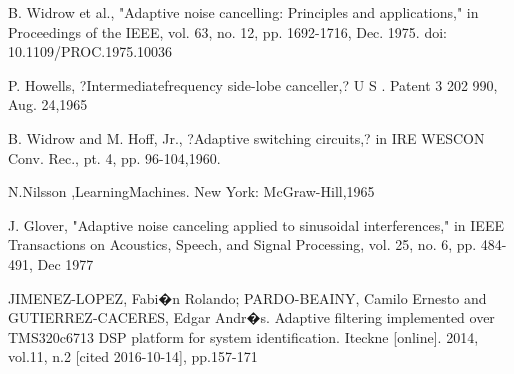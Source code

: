 \documentclass[conference]{IEEEtran}
\begin{document}
%
%
%
\begin{thebibliography}{1}

B. Widrow et al., "Adaptive noise cancelling: Principles and applications," in Proceedings of the IEEE, vol. 63, no. 12, pp. 1692-1716, Dec. 1975.
doi: 10.1109/PROC.1975.10036

P. Howells, ?Intermediatefrequency side-lobe canceller,? U S .
Patent 3 202 990, Aug. 24,1965

B. Widrow and M. Hoff, Jr., ?Adaptive switching circuits,? in
IRE WESCON Conv. Rec., pt. 4, pp. 96-104,1960.

N.Nilsson ,LearningMachines. New York: McGraw-Hill,1965

J. Glover, "Adaptive noise canceling applied to sinusoidal interferences," in IEEE Transactions on Acoustics, Speech, and Signal Processing, vol. 25, no. 6, pp. 484-491, Dec 1977

JIMENEZ-LOPEZ, Fabi�n Rolando; PARDO-BEAINY, Camilo Ernesto  and  GUTIERREZ-CACERES, Edgar Andr�s. Adaptive filtering implemented over TMS320c6713 DSP platform for system identification. Iteckne [online]. 2014, vol.11, n.2 [cited  2016-10-14], pp.157-171

\end{thebibliography}




\end{document}

